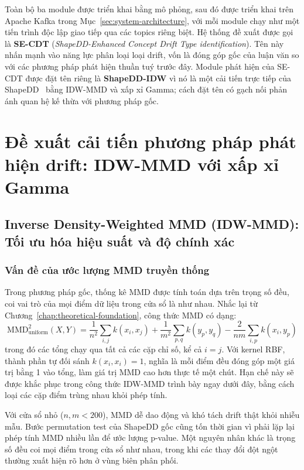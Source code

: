 \label{par:naming-convention}
Toàn bộ ba module được triển khai bằng mô phỏng, sau đó được triển khai trên Apache Kafka trong Mục~\ref{sec:system-architecture}, với mỗi module chạy như một tiến trình độc lập giao tiếp qua các topics riêng biệt. Hệ thống đề xuất được gọi là \textbf{SE-CDT} (\textit{ShapeDD-Enhanced Concept Drift Type identification}). Tên này nhấn mạnh vào năng lực phân loại loại drift, vốn là đóng góp gốc của luận văn so với các phương pháp phát hiện thuần tuý trước đây. Module phát hiện của SE-CDT được đặt tên riêng là \textbf{ShapeDD-IDW} vì nó là một cải tiến trực tiếp của ShapeDD~\cite{shapeDD2021} bằng IDW-MMD và xấp xỉ Gamma; cách đặt tên có gạch nối phản ánh quan hệ kế thừa với phương pháp gốc.

\section{Đề xuất cải tiến phương pháp phát hiện drift: IDW-MMD với xấp xỉ Gamma}

\subsection{Inverse Density-Weighted MMD (IDW-MMD): Tối ưu hóa hiệu suất và độ chính xác}
\label{sec:idw-mmd}

\subsubsection{Vấn đề của ước lượng MMD truyền thống}
Trong phương pháp gốc, thống kê MMD được tính toán dựa trên trọng số đều, coi vai trò của mọi điểm dữ liệu trong cửa sổ là như nhau. Nhắc lại từ Chương~\ref{chap:theoretical-foundation}, công thức MMD có dạng:
\begin{equation}
	\text{MMD}^2_{\text{uniform}}(X, Y) = \frac{1}{n^2}\sum_{i,j} k(x_i, x_j) + \frac{1}{m^2}\sum_{p,q} k(y_p, y_q) - \frac{2}{nm}\sum_{i,p} k(x_i, y_p)
\end{equation}
trong đó các tổng chạy qua tất cả các cặp chỉ số, kể cả $i=j$. Với kernel RBF, thành phần tự đối sánh $k(x_i, x_i) = 1$, nghĩa là mỗi điểm đều đóng góp một giá trị bằng 1 vào tổng, làm giá trị MMD cao hơn thực tế một chút. Hạn chế này sẽ được khắc phục trong công thức IDW-MMD trình bày ngay dưới đây, bằng cách loại các cặp điểm trùng nhau khỏi phép tính.

Với cửa sổ nhỏ ($n, m < 200$), MMD dễ dao động và khó tách drift thật khỏi nhiễu mẫu. Bước permutation test của ShapeDD gốc cũng tốn thời gian vì phải lặp lại phép tính MMD nhiều lần để ước lượng p-value. Một nguyên nhân khác là trọng số đều coi mọi điểm trong cửa sổ như nhau, trong khi các thay đổi đột ngột thường xuất hiện rõ hơn ở vùng biên phân phối.


